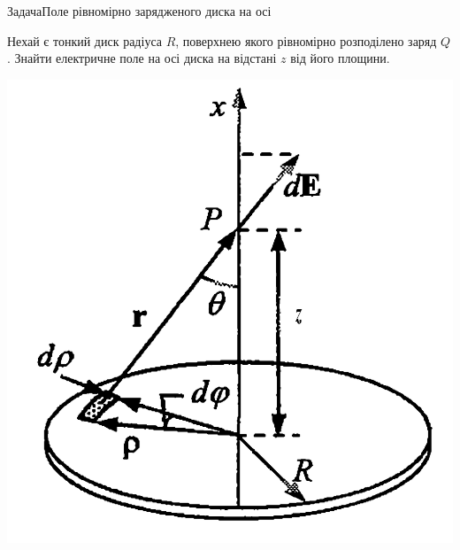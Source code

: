 \documentclass{beamer}
\begin{document}
\begin{frame}{Задача}{Поле рівномірно зарядженого диска на осі}
	\begin{exampleblock}{}\justifying
		Нехай є тонкий диск радіуса $R$, поверхнею якого рівномірно розподілено
		заряд $Q$. Знайти електричне поле на осі диска на відстані $z$ від його
		площини.
	\end{exampleblock}
	\begin{center}
		\includegraphics[width=0.5\linewidth]{disk}
	\end{center}
\end{frame}





\end{document}
